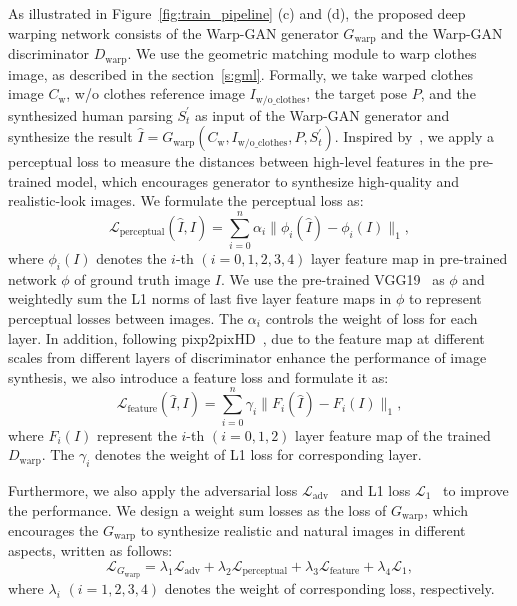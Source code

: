 \documentclass[10pt,twocolumn,letterpaper]{article}
\begin{document}
As illustrated in Figure~\ref{fig:train_pipeline} (c) and (d), the proposed deep warping network consists of the Warp-GAN generator $G_{\text{warp}}$ and the Warp-GAN discriminator $D_{\text{warp}}$. We use the geometric matching module to warp clothes image, as described in the section~\ref{s:gml}. Formally, we take warped clothes image $C_{\text{w}}$, w/o clothes reference image $I_{\text{w/o\_clothes}}$, the target pose $P$, and the synthesized human parsing $S^{'}_t$ as input of the Warp-GAN generator and synthesize the result $\hat{I} = G_{\text{warp}}(C_{\text{w}}, I_{\text{w/o\_clothes}}, P, S^{'}_t)$.
Inspired by~\cite{johnson2016perceptual,han2017viton,ledig2016photo}, we apply a perceptual loss to measure the distances between high-level features in the pre-trained model, which encourages generator to synthesize high-quality and realistic-look images. We formulate the perceptual loss as:
\begin{equation}
	\mathcal{L}_{\text{perceptual}}(\hat{I}, I) = \sum_{i=0}^{n} \alpha_{i} \| \phi_{i}(\hat{I}) - \phi_{i}(I) \|_{1},
\end{equation}
where $\phi_{i}(I)$ denotes the $i$-th $(i=0,1,2,3,4)$ layer feature map in pre-trained network $\phi$ of ground truth image $I$. We use the pre-trained VGG19~\cite{simonyan2015very} as $\phi$ and weightedly sum the L1 norms of last five layer feature maps in $\phi$ to represent perceptual losses between images. The $\alpha_{i}$ controls the weight of loss for each layer. 
In addition, following pixp2pixHD~\cite{wang2017pix2pixHD}, due to the feature map at different scales from different layers of discriminator enhance the performance of image synthesis, we also introduce a feature loss and formulate it as: 
\begin{equation}
	\mathcal{L}_{\text{feature}}(\hat{I}, I) = \sum_{i=0}^{n} \gamma_{i} \| F_{i}(\hat{I}) - F_{i}(I) \|_{1},
    \label{eq:feature}
\end{equation}
where $F_i(I)$ represent the $i$-th $(i=0,1,2)$ layer feature map of the trained $D_{\text{warp}}$. The $\gamma_{i}$ denotes the weight of L1 loss for corresponding layer.

Furthermore, we also apply the adversarial loss $\mathcal{L}_{\text{adv}}$~\cite{goodfellow2014generative,mirza2014cgan} and L1 loss $\mathcal{L}_{\text{1}}$~\cite{yan2017skeleton} to improve the performance. We design a weight sum losses as the loss of $G_{\text{warp}}$, which encourages the $G_{\text{warp}}$ to synthesize realistic and natural images in different aspects, written as follows:
\begin{equation}
	\mathcal{L}_{G_{\text{warp}}} = \lambda_{1} \mathcal{L}_{\text{adv}}  +  \lambda_{2} \mathcal{L}_{\text{perceptual}} +  \lambda_{3} \mathcal{L}_{\text{feature}} +  \lambda_{4} \mathcal{L}_{\text{1}},
    \label{eq:loss}
\end{equation}
 where $\lambda_{i}$ $(i=1,2,3,4)$ denotes the weight of corresponding loss, respectively. 
\end{document}
